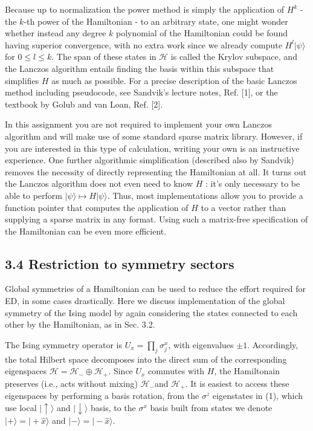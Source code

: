\documentclass[12pt]{article}
\begin{document}
Because up to normalization the power method is simply the application of $H^{k}$ - the $k$-th power of the Hamiltonian - to an arbitrary state, one might wonder whether instead any degree $k$ polynomial of the Hamiltonian could be found having superior convergence, with no extra work since we already compute $H^{l}|\psi\rangle$ for $0 \leq l \leq k$. The span of these states in $\mathcal{H}$ is called the Krylov subspace, and the Lanczos algorithm entails finding the basis within this subspace that simplifies $H$ as much as possible. For a precise description of the basic Lanczos method including pseudocode, see Sandvik's lecture notes, Ref. [1], or the textbook by Golub and van Loan, Ref. [2].

In this assignment you are not required to implement your own Lanczos algorithm and will make use of some standard sparse matrix library. However, if you are interested in this type of calculation, writing your own is an instructive experience. One further algorithmic simplification (described also by Sandvik) removes the necessity of directly representing the Hamiltonian at all. It turns out the Lanczos algorithm does not even need to know $H$ : it's only necessary to be able to perform $|\psi\rangle \mapsto H|\psi\rangle$. Thus, most implementations allow you to provide a function pointer that computes the application of $H$ to a vector rather than supplying a sparse matrix in any format. Using such a matrix-free specification of the Hamiltonian can be even more efficient.

\subsection*{3.4 Restriction to symmetry sectors}
Global symmetries of a Hamiltonian can be used to reduce the effort required for ED, in some cases drastically. Here we discuss implementation of the global symmetry of the Ising model by again considering the states connected to each other by the Hamiltonian, as in Sec. 3.2.

The Ising symmetry operator is $U_{x}=\prod_{j} \sigma_{j}^{x}$, with eigenvalues $\pm 1$. Accordingly, the total Hilbert space decomposes into the direct sum of the corresponding eigenspaces $\mathcal{H}=\mathcal{H}_{-} \oplus \mathcal{H}_{+}$. Since $U_{x}$ commutes with $H$, the Hamiltonain preserves (i.e., acts without mixing) $\mathcal{H}_{-}$and $\mathcal{H}_{+}$. It is easiest to access these eigenspaces by performing a basis rotation, from the $\sigma^{z}$ eigenstates in (1), which use local $|\uparrow\rangle$ and $|\downarrow\rangle$ basis, to the $\sigma^{x}$ basis built from states we denote $|+\rangle=|+\hat{x}\rangle$ and $|-\rangle=|-\hat{x}\rangle$.
\end{document}
